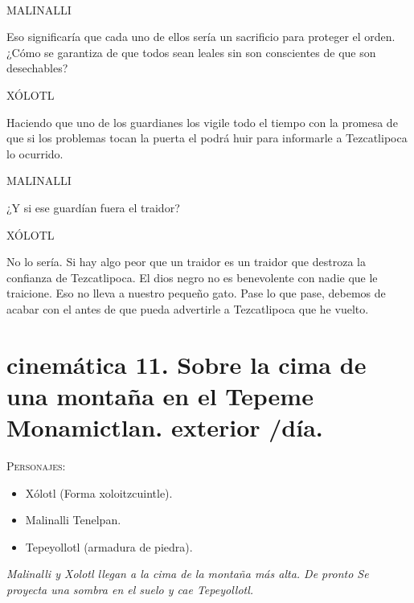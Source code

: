 \documentclass[11pt,letterpaper]{article}
\begin{document}
\begin{center}
\\
\par
MALINALLI
\\
\par
Eso significaría que cada uno de ellos sería un sacrificio para proteger el orden. ¿Cómo se garantiza de que todos sean leales sin son conscientes de que son desechables?
\\
\par
XÓLOTL
\\
\par
Haciendo que uno de los guardianes los vigile todo el tiempo con la promesa de que si los problemas tocan la puerta el podrá huir para informarle a Tezcatlipoca lo ocurrido. 
\\
\par
MALINALLI
\\
\par
¿Y si ese guardían fuera el traidor?
\\
\par
XÓLOTL
\\
\par
No lo sería. Si hay algo peor que un traidor es un traidor que destroza la confianza de Tezcatlipoca. El dios negro no es benevolente con nadie que le traicione. Eso no lleva a nuestro pequeño gato. Pase lo que pase, debemos de acabar con el antes de que pueda advertirle a Tezcatlipoca que he vuelto.
\end{center}

\section{cinemática 11. Sobre la cima de una montaña en el Tepeme Monamictlan. exterior /día.}
 \textsc{Personajes}:
 \begin{itemize}
 	\item Xólotl (Forma xoloitzcuintle).
	\item Malinalli Tenelpan.
	\item Tepeyollotl (armadura de piedra).
 \end{itemize}
 
 \textit{Malinalli y Xolotl llegan a la cima de la montaña más alta. De pronto Se proyecta una sombra en el suelo y cae Tepeyollotl.}
 
\end{document}
